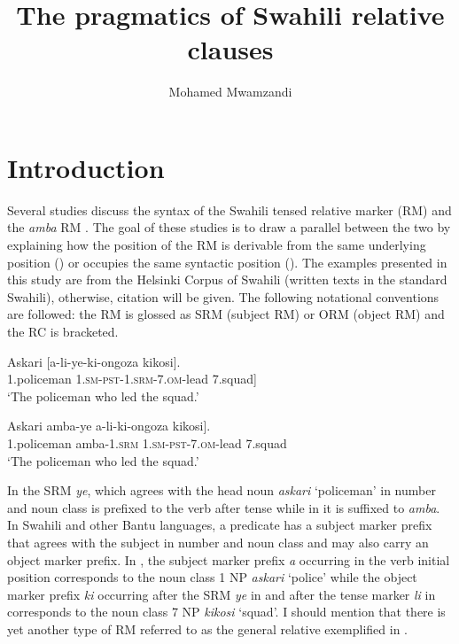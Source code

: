 \documentclass[output=paper,colorlinks,citecolor=brown]{langscibook}
\author{Mohamed Mwamzandi\affiliation{University of North Carolina at Chapel Hill}}
\title{The pragmatics of Swahili relative clauses}
\begin{document}
\maketitle 

\section{Introduction}\label{sec:mwamzandi:1}

Several studies discuss the syntax of the Swahili tensed relative marker (RM)  and the \textit{amba} RM . The goal of these studies is to draw a parallel between the two by explaining how the position of the RM is derivable from the same underlying position (\citealt{Vitale1981, Keach1985}) or occupies the same syntactic position (\citealt{DemuthHarford1999, Ngonyani2001, Ngonyani2006}). The examples presented in this study are from the Helsinki Corpus of Swahili (written texts in the standard Swahili), otherwise, citation will be given. The following notational conventions are followed: the RM is glossed as SRM (subject RM) or ORM (object RM) and the RC is bracketed.

\ea%
    \label{ex:mwamzandi:1}
    \gll    Askari [a-li-ye-ki-ongoza kikosi].\\
            1.policeman  \textsc{1.sm-pst-1.srm-7.om-}lead  7.squad]\\
    \glt    ‘The policeman who led the squad.’
\z

\ea%
    \label{ex:mwamzandi:2}
    \gll    Askari amba-ye a-li-ki-ongoza kikosi].\\
            1.policeman  amba\textsc{-1.srm}  \textsc{1.sm-pst-7.om-}lead  7.squad\\
    \glt    ‘The policeman who led the squad.’
\z

In  the SRM \textit{ye}, which agrees with the head noun \textit{askari} ‘policeman’ in number and noun class is prefixed to the verb after tense while in  it is suffixed to \textit{amba}. In Swahili and other Bantu languages, a predicate has a subject marker prefix that agrees with the subject in number and noun class and may also carry an object marker prefix. In , the subject marker prefix \textit{a} occurring in the verb initial position corresponds to the noun class 1 NP \textit{askari} ‘police’ while the object marker prefix \textit{ki} occurring after the SRM \textit{ye} in  and after the tense marker \textit{li} in  corresponds to the noun class 7 NP \textit{kikosi} ‘squad’. I should mention that there is yet another type of RM referred to as the general relative exemplified in .
\end{document}
